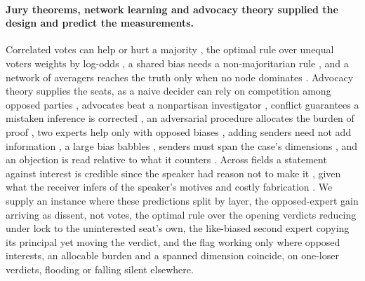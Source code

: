 \paragraph{Jury theorems, network learning and advocacy theory supplied the design and predict the measurements.}
Correlated votes can help or hurt a majority
\citep{ladha1992condorcet,boland1989majority,dietrich2013independent}, the
optimal rule over unequal voters weights by log-odds
\citep{nitzan1982optimal,shapley1984optimizing}, a shared bias needs a
non-majoritarian rule \citep{prelec2017solution}, and a network of averagers
reaches the truth only when no node dominates
\citep{degroot1974reaching,golub2010naive}. Advocacy theory supplies the
seats, as a naive decider can rely on competition among opposed parties
\citep{milgrom1986relying,froeb1996naive}, advocates beat a nonpartisan
investigator \citep{dewatripont1999advocates}, conflict guarantees a mistaken
inference is corrected \citep{lipman1995robust}, an adversarial procedure
allocates the burden of proof \citep{shin1998adversarial}, two experts help
only with opposed biases \citep{krishna2001model}, adding senders need not add
information \citep{gentzkow2017competition}, a large bias babbles
\citep{crawford1982strategic}, senders must span the case's dimensions
\citep{battaglini2002multiple}, and an objection is read relative to what it
counters \citep{glazer2001debates,glazer2004optimal}. Across fields a
statement against interest is credible since the speaker had reason not to
make it \citep{fre2024statement,jefferson1944declarations}, given what the
receiver infers of the speaker's motives \citep{sobel1985credibility} and
costly fabrication \citep{sanchirico2001relying}. We supply an instance where
these predictions split by layer, the opposed-expert gain arriving as dissent,
not votes, the optimal rule over the opening verdicts reducing under lock to
the uninterested seat's own, the like-biased second expert copying its
principal yet moving the verdict, and the flag working only where opposed
interests, an allocable burden and a spanned dimension coincide, on one-loser
verdicts, flooding or falling silent elsewhere.

